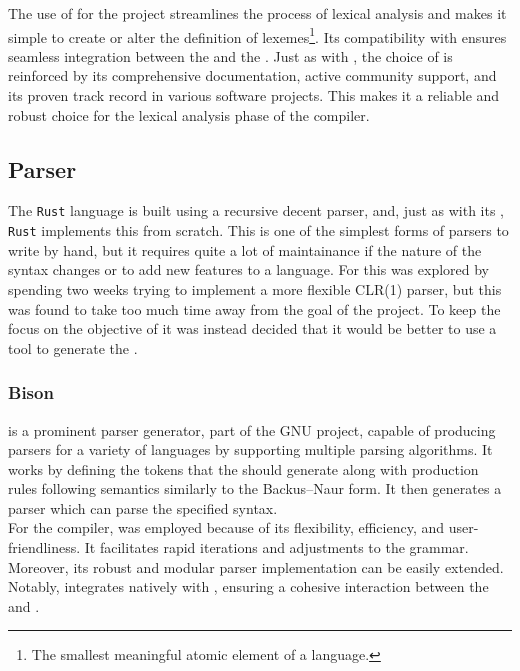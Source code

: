 The use of \lexerGen{} for the \lang{} project streamlines the process of lexical
analysis and makes it simple to create or alter the definition of
lexemes\footnote{The smallest meaningful atomic element of a language.}. Its
compatibility with \parserGen{} ensures seamless integration between the \lexer{} and
the \parser. Just as with \parserGen, the choice of \lexerGen{} is reinforced by its
comprehensive documentation, active community support, and its proven track record in
various software projects. This makes it a reliable and robust choice for the lexical
analysis phase of the \lang{} compiler.

\subsection{Parser}
\label{sec:techParser}

The \texttt{Rust} language is built using a recursive decent parser, and, just as
with its \lexer{}, \texttt{Rust} implements this from
scratch\cite{RUST-COMPILER-SRC}. This is one of the simplest forms of parsers to
write by hand, but it requires quite a lot of maintainance if the nature of the
syntax changes or to add new features to a language. For \lang{} this was explored by
spending two weeks trying to implement a more flexible CLR(1) parser, but this was
found to take too much time away from the goal of the project. To keep the focus on
the objective of \lang{} it was instead decided that it would be better to use a tool
to generate the \parser{}.

\subsubsection{Bison}
\label{sec:bison}

\parserGen{} is a prominent parser generator, part of the GNU project, capable of
producing parsers for a variety of languages by supporting multiple parsing
algorithms\cite{BISON}. 
It works by defining the tokens that the \lexer{} should generate along with production rules
following semantics similarly to the Backus–Naur form\cite{BNF}. It then generates a
parser which can parse the specified syntax.\\

For the \lang{} compiler, \parserGen{} was employed because of its flexibility,
efficiency, and user-friendliness. It facilitates rapid iterations and adjustments to
the grammar. Moreover, its robust and modular parser implementation can be easily
extended. Notably, \parserGen{} integrates natively with \lexerGen{}, ensuring a
cohesive interaction between the \lexer{} and \parser{}. \\

